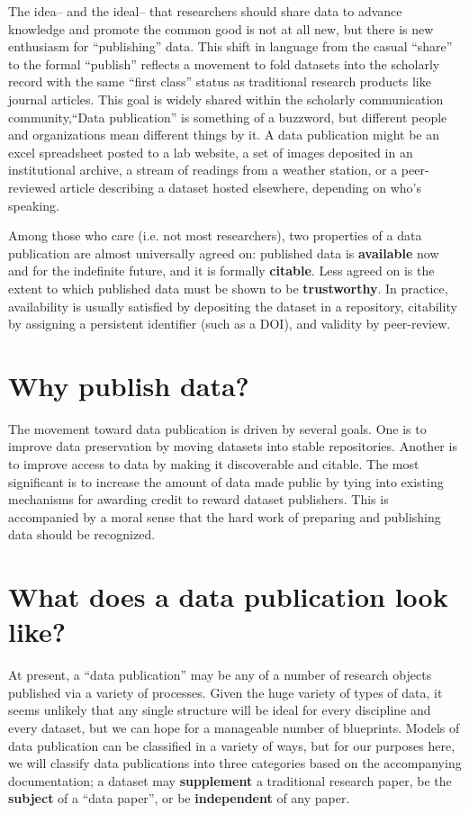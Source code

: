 \documentclass[10pt,a4paper,twocolumn]{article}
\begin{document}
The idea– and the ideal– that researchers should share data to advance knowledge and promote the common good is not at all new, but there is new enthusiasm for ``publishing'' data.
This shift in language from the casual ``share'' to the formal ``publish'' reflects a movement to fold datasets into the scholarly record with the same ``first class'' status as traditional research products like journal articles.
This goal is widely shared within the scholarly communication community,``Data publication'' is something of a buzzword, but different people and organizations mean different things by it.
A data publication might be an excel spreadsheet posted to a lab website, a set of images deposited in an institutional archive, a stream of readings from a weather station, or a peer-reviewed article describing a dataset hosted elsewhere, depending on who's speaking.

Among those who care (i.e. not most researchers), two properties of a data publication are almost universally agreed on: published data is \textbf{available} now and for the indefinite future, and it is formally \textbf{citable}. 
Less agreed on is the extent to which published data must be shown to be \textbf{trustworthy}.
In practice, availability is usually satisfied by depositing the dataset in a repository, citability by assigning a persistent identifier (such as a DOI), and validity by peer-review.

\section*{Why publish data?}\label{why-publish-data}

The movement toward data publication is driven by several goals.
One is to improve data preservation by moving datasets into stable repositories.
Another is to improve access to data by making it discoverable and citable.
The most significant is to increase the amount of data made public by tying into existing mechanisms for awarding credit to reward dataset publishers.
This is accompanied by a moral sense that the hard work of preparing and publishing data should be recognized.

\section*{What does a data publication look like?}\label{what-does-a-data-publication-look-like}

At present, a ``data publication'' may be any of a number of research objects published via a variety of processes.
Given the huge variety of types of data, it seems unlikely that any single structure will be ideal for every discipline and every dataset, but we can hope for a manageable number of blueprints. 
Models of data publication can be classified in a variety of ways, but for our purposes here, we will classify data publications into three categories based on the accompanying documentation; a dataset may \textbf{supplement} a traditional research paper, be the \textbf{subject} of a ``data paper'', or be \textbf{independent} of any paper.
\end{document}
